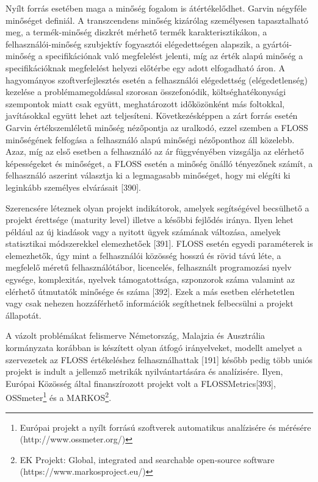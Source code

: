 \documentclass[12pt,magyar,a4paper,oneside]{scrreprt}
\begin{document}
Nyílt forrás esetében maga a minőség fogalom is átértékelődhet. Garvin
négyféle minőséget definiál. A transzcendens minőség kizárólag
személyesen tapasztalható meg, a termék-minőség diszkrét mérhető termék
karakterisztikákon, a felhasználói-minőség szubjektív fogyasztói
elégedettségen alapszik, a gyártói-minőség a specifikációnak való
megfelelést jelenti, míg az érték alapú minőség a specifikációknak
megfelelést helyezi előtérbe egy adott elfogadható áron. A hagyományos
szoftverfejlesztés esetén a felhasználói elégedettség (elégedetlenség)
kezelése a problémamegoldással szorosan összefonódik,
költséghatékonysági szempontok miatt csak együtt, meghatározott
időközönként más foltokkal, javításokkal együtt lehet azt teljesíteni.
Következésképpen a zárt forrás esetén Garvin értékszemléletű minőség
nézőpontja az uralkodó, ezzel szemben a FLOSS minőségének felfogása a
felhasználó alapú minőségi nézőponthoz áll közelebb. Azaz, míg az első
esetben a felhasználó az ár függvényében vizsgálja az elérhető
képességeket és minőséget, a FLOSS esetén a minőség önálló tényezőnek
számít, a felhasználó aszerint választja ki a legmagasabb minőséget,
hogy mi elégíti ki leginkább személyes elvárásait {[}390{]}.

Szerencsére léteznek olyan projekt indikátorok, amelyek segítségével
becsülhető a projekt érettsége (maturity level) illetve a későbbi
fejlődés iránya. Ilyen lehet például az új kiadások vagy a nyitott ügyek
számának változása, amelyek statisztikai módszerekkel elemezhetőek
{[}391{]}. FLOSS esetén egyedi paraméterek is elemezhetők, úgy mint a
felhasználói közösség hosszú és rövid távú léte, a megfelelő méretű
felhasználótábor, licencelés, felhasznált programozási nyelv egysége,
komplexitás, nyelvek támogatottsága, szponzorok száma valamint az
elérhető útmutatók minősége és száma {[}392{]}. Ezek a más esetben
elérhetetlen vagy csak nehezen hozzáférhető információk segíthetnek
felbecsülni a projekt állapotát.

A vázolt problémákat felismerve Németország, Malajzia és Ausztrália
kormányzata korábban is készített olyan átfogó irányelveket, modellt
amelyet a szervezetek az FLOSS értékeléshez felhasználhattak {[}191{]}
később pedig több uniós projekt is indult a jellemző metrikák
nyilvántartására és analízisére. Ilyen, Európai Közösség által
finanszírozott projekt volt a FLOSSMetrics{[}393{]}, OSSmeter\footnote{Európai
  projekt a nyílt forrású szoftverek automatikus analízisére és mérésére
  (http://www.ossmeter.org/)} és a MARKOS\footnote{EK Projekt: Global,
  integrated and searchable open-source software
  (https://www.markosproject.eu/)}.
\end{document}
